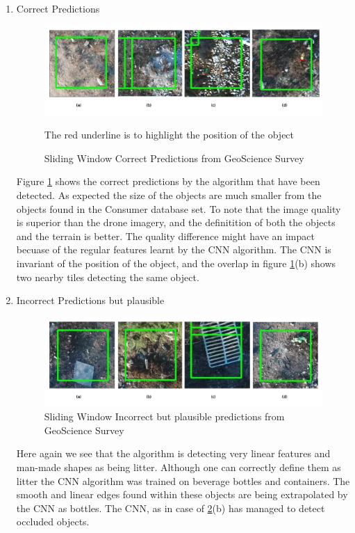 \documentclass{IEEEtran}
\begin{document}
\begin{enumerate}
\item Correct Predictions
\begin{figure}[H]
\centering
\includegraphics[scale=0.4]{images/test1-correct1.png}
\caption{Sliding Window Correct Predictions from GeoScience Survey}
\label{fig:correct2}
{\tiny The red underline is to highlight the position of the object}
\end{figure}

Figure \ref{fig:correct2} shows the correct predictions by the algorithm that have been detected. As expected the size of the objects are much smaller from the objects found in the Consumer database set. To note that the image quality is superior than the drone imagery, and the definitition of both the objects and the terrain is better. The quality difference might have an impact becuase of the regular features learnt by the CNN algorithm. The CNN is invariant of the position of the object, and the overlap in figure \ref{fig:correct2}(b) shows two nearby tiles detecting the same object.\newline


\item Incorrect Predictions but plausible
\begin{figure}[H]
\centering
\includegraphics[scale=0.4]{images/test1-plausible1.png}
\caption{Sliding Window Incorrect but plausible predictions from GeoScience Survey}
\label{fig:plausible2}
\end{figure}

Here again we see that the algorithm is detecting very linear features and man-made shapes as being litter. Although one can correctly define them as litter the CNN algorithm was trained on beverage bottles and containers. The smooth and linear edges found within these objects are being extrapolated by the CNN as bottles. The CNN, as in case of \ref{fig:plausible2}(b) has managed to detect occluded objects. 


\end{enumerate}
\end{document}
